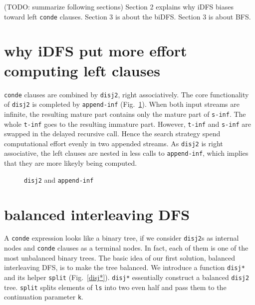 \documentclass[format=acmlarge, review=true, authordraft=true]{acmart}
\begin{document}


(TODO: summarize following sections) Section 2 explains why iDFS biases toward left \texttt{conde} clauses. Section 3 is about the biDFS. Section 3 is about BFS.

\section{why iDFS put more effort computing left clauses}

\texttt{conde} clauses are combined by \texttt{disj2}, right associatively. The core functionality of \texttt{disj2} is completed by \texttt{append-inf} (Fig.~\ref{disj2-and-append-inf}). When both input streams are infinite, the resulting mature part contains only the mature part of \texttt{s-inf}. The whole \texttt{t-inf} goes to the resulting immature part. However, \texttt{t-inf} and \texttt{s-inf} are swapped in the delayed recursive call. Hence the search strategy spend computational effort evenly in two appended streams. As \texttt{disj2} is right associative, the left clauses are nested in less calls to \texttt{append-inf}, which implies that they are more likeyly being computed.

\begin{figure}
  
  \caption{\texttt{disj2} and \texttt{append-inf}}
  \label{disj2-and-append-inf}
\end{figure}
 
\section{balanced interleaving DFS}

A \texttt{conde} expression looks like a binary tree, if we consider \texttt{disj2}s as internal nodes and \texttt{conde} clauses as a terminal nodes. In fact, each of them is one of the most unbalanced binary trees. The basic idea of our first solution, balanced interleaving DFS, is to make the tree balanced. We introduce a function \texttt{disj*} and its helper \texttt{split} (Fig.~\ref{disj*}). \texttt{disj*} essentially construct a balanced \texttt{disj2} tree. \texttt{split} splits elements of \texttt{ls} into two even half and pass them to the continuation parameter \texttt{k}.
\end{document}
